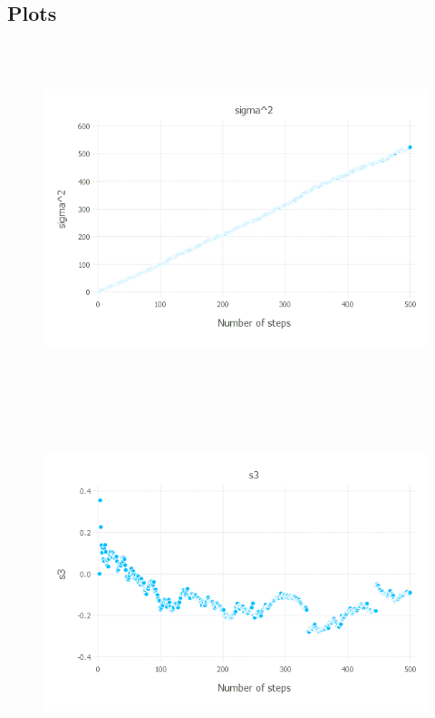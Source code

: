 \documentclass{article}
\begin{document}
\subsection{Plots}
\begin{figure}[H]
	\includegraphics[width=6in,height=4in]{"sq"}
\end{figure}
\begin{figure}[H]
	\includegraphics[width=6in,height=4in]{"tr"}
\end{figure}
\end{document}
